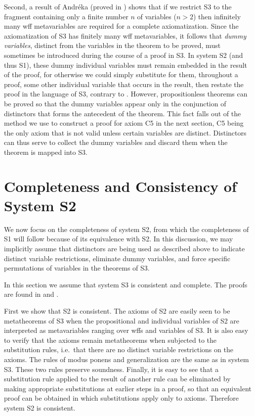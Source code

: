 \documentclass[leqno]{article}
\begin{document}
     Second, a result of Andr{\'{e}}ka (proved in \cite{Nemeti}) shows that if we
restrict S3 to the fragment containing only a finite number $n$ of variables
($n>2$) then infinitely many wff metavariables are required for a complete
axiomatization. Since the axiomatization of S3 has finitely many wff
metavariables, it follows that {\em dummy variables}, distinct from the
variables in the theorem to be proved, must sometimes be introduced during the
course of a proof in S3. In system S2 (and thus S1), these dummy individual
variables must remain embedded in the result of the proof, for otherwise we
could simply substitute for them, throughout a proof, some other individual
variable that occurs in the result, then restate the proof in the language of
S3, contrary to \cite{Nemeti}.  However, propositionless theorems can be
proved so that the dummy variables appear only in the conjunction of
distinctors that forms the antecedent of the theorem.  This fact falls out of
the method we use to construct a proof for axiom C5 in the next section, C5
being the only axiom that is not valid unless certain variables are distinct.
Distinctors can thus serve to collect the dummy variables and discard them
when the theorem is mapped into S3.

 \section{Completeness and Consistency of System S2}\label{completeness}

     We now focus on the completeness of system S2, from which the
completeness of S1 will follow because of its equivalence with S2.  In this
discussion, we may implicitly assume that distinctors are being used as
described above to indicate distinct variable restrictions, eliminate dummy
variables, and force specific permutations of variables in the theorems of S3.

     In this section we assume that system S3 is consistent and complete.  The
proofs are found in \cite{Tarski} and \cite{Kalish}.

     First we show that S2 is consistent.  The axioms of S2 are easily seen
to be metatheorems of S3 when the propositional and individual variables of
S2 are interpreted as metavariables ranging over wffs and variables of S3.
It is also easy to verify that the axioms remain metatheorems when subjected
to the substitution rules, i.e.\ that there are no distinct variable
restrictions on the axioms.  The rules of modus ponens and generalization are
the same as in system S3.  These two rules preserve soundness.  Finally, it is
easy to see that a substitution rule applied to the result of another rule can
be eliminated by making appropriate substitutions at earlier steps in a proof,
so that an equivalent proof can be obtained in which substitutions apply only
to axioms.  Therefore system S2 is consistent.
\end{document}
